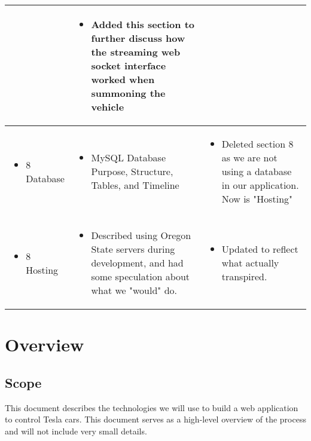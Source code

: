 \documentclass[onecolumn, draftclsnofoot,10pt, compsoc]{IEEEtran}
\begin{document}
\begin{longtable}{p{} | p{} | p{}}
\begin{itemize}
        \end{itemize}
        & \begin{itemize}
            \item Added this section to further discuss how the streaming web socket interface worked when summoning the vehicle
        \end{itemize}
        \\\hline
        \begin{itemize}
            \item 8 Database
        \end{itemize}
        & \begin{itemize}
            \item MySQL Database Purpose, Structure, Tables, and Timeline
        \end{itemize}
        & \begin{itemize}
            \item Deleted section 8 as we are not using a database in our application. Now is "Hosting"
        \end{itemize}
        \\\hline
        \begin{itemize}
            \item 8 Hosting
        \end{itemize}
        & \begin{itemize}
            \item Described using Oregon State servers during development, and had some speculation about what we "would" do.
        \end{itemize}
        & \begin{itemize}
            \item Updated to reflect what actually transpired.
        \end{itemize}
       
    
    \end{longtable}

\section{Overview}

    \subsection{Scope}
        This document describes the technologies we will use to build a web application to control Tesla cars. This document serves as a high-level overview of the process and will not include very small details.
\end{document}
